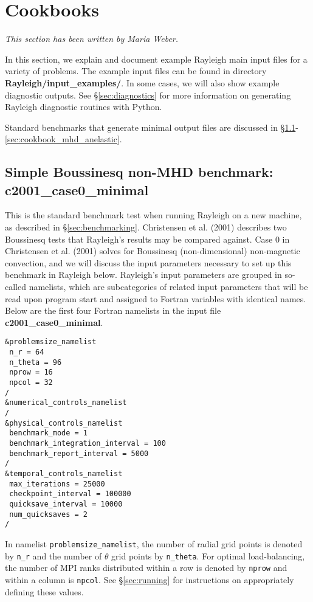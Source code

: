 \clearpage


\section{Cookbooks}\label{sec:cookbooks}
\emph{This section has been written by Maria Weber.}

In this section, we explain and document example Rayleigh main input files for a variety of problems. The example input files can be found in directory \textbf{Rayleigh/input\_examples/}. In some cases, we will also show example diagnostic outputs. See \S \ref{sec:diagnostics} for more information on generating Rayleigh diagnostic routines with Python. 

Standard benchmarks that generate minimal output files are discussed in \S \ref{sec:cookbook_case0_minimal}-\ref{sec:cookbook_mhd_anelastic}. 


\subsection{Simple Boussinesq non-MHD benchmark: c2001\_case0\_minimal}\label{sec:cookbook_case0_minimal}

This is the standard benchmark test when running Rayleigh on a new machine, as described in \S \ref{sec:benchmarking}. Christensen et al. (2001) describes two Boussinesq tests that Rayleigh's results may be compared against. Case 0 in Christensen et al. (2001) solves for Boussinesq (non-dimensional) non-magnetic convection, and we will discuss the input parameters necessary to set up this benchmark in Rayleigh below. Rayleigh's input parameters are grouped in so-called namelists, which are subcategories of related input parameters that will be read upon program start and assigned to Fortran variables with identical names. Below are the first four Fortran namelists in the input file \textbf{c2001\_case0\_minimal}.
    
\begin{lstlisting}
&problemsize_namelist
 n_r = 64
 n_theta = 96
 nprow = 16
 npcol = 32
/
&numerical_controls_namelist
/
&physical_controls_namelist
 benchmark_mode = 1
 benchmark_integration_interval = 100
 benchmark_report_interval = 5000
/
&temporal_controls_namelist
 max_iterations = 25000
 checkpoint_interval = 100000
 quicksave_interval = 10000
 num_quicksaves = 2
/
\end{lstlisting}    

In namelist \texttt{problemsize\_namelist}, the number of radial grid points is denoted by \texttt{n\_r} and the number of $\theta$ grid points by \texttt{n\_theta}. For optimal load-balancing, the number of MPI ranks distributed within a row is denoted by \texttt{nprow} and within a column is \texttt{npcol}. See \S \ref{sec:running} for instructions on appropriately defining these values.

